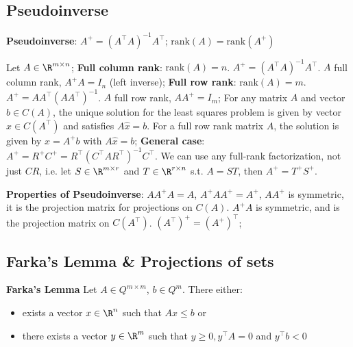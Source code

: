 \newsectionNoPB
\subsection{Pseudoinverse}
\textbf{Pseudoinverse}: $A^+ = (A^{\top}A)^{-1}A^{\top}$; $\text{rank}(A) = \text{rank}(A^+)$

Let $A \in \R^{m \times n}$;
\shortdef \textbf{Full column rank}: $\text{rank}(A) = n$. $A^+ = (A^{\top}A)^{-1}A^{\top}$.
\shortproposition $A$ full column rank, $A^+A = I_n$ (left inverse);
\shortdef \textbf{Full row rank}: $\text{rank}(A) = m$. $A^+ = AA^{\top}(AA^{\top})^{-1}$.
\shortlemma $A$ full row rank, $AA^+ = I_m$;
\shortlemma For any matrix $A$ and vector $b \in C(A)$, the unique solution for the least squares problem is given by vector $\hat{x} \in C(A^{\top})$ and satisfies $A\hat{x} = b$.
\shortproposition For a full row rank matrix $A$, the solution is given by $\hat{x} = A^+ b$ with $A\hat{x} = b$;
\shortdef \textbf{General case}: $A^+ = R^+ C^+ = R^{\top}(C^{\top}AR^{\top})^{-1}C^{\top}$.
We can use any full-rank factorization, not just $CR$, i.e. \setcounter{all}{9}\shortproposition let $S\in \R^{m \times r}$ and $T \in \R^{r \times n}$ s.t. $A = ST$, then $A^+ = T^+S^+$.

\setcounter{all}{11}\shorttheorem \textbf{Properties of Pseudoinverse}: $AA^+A = A$, $A^+AA^+ = A^+$, $AA^+$ is symmetric, it is the projection matrix for projections on $C(A)$. $A^+A$ is symmetric, and is the projection matrix on $C(A^{\top})$. $(A^{\top})^+ = (A^+)^{\top}$;


\newsectionNoPB
\subsection{Farka's Lemma \& Projections of sets}
\setcounter{all}{7}\shorttheorem \textbf{Farka's Lemma} Let $A \in Q^{m \times m}$, $b \in Q^m$. There either:
\begin{itemize}
    \item exists a vector $x \in \R^n$ such that $Ax \leq b$ or
    \item there exists a vector $y \in \R^m$ such that $y \geq 0, y^{\top}A = 0$ and $y^{\top}b < 0$
\end{itemize}

